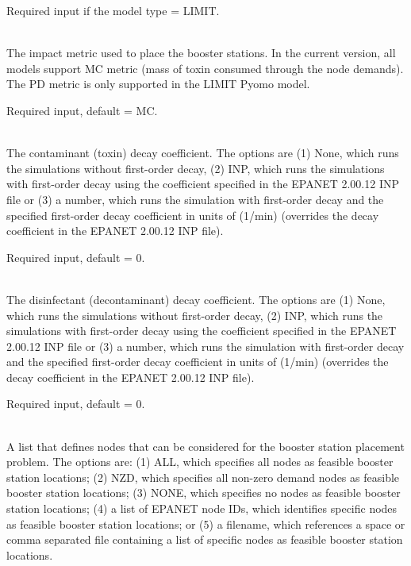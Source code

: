 \begin{description}[topsep=0pt,parsep=0.5em,itemsep=-0.4em]
\begin{description}[topsep=0pt,parsep=0.5em,itemsep=-0.4em]
                Required input if the model type = LIMIT.
    \item[{objective}]\hfill
\\The impact metric used to place the booster stations.
                In the current version, all models support MC metric
                (mass of toxin consumed through the node demands). The
                PD metric is only supported in the LIMIT Pyomo model.                
                
                Required input, default = MC.
    \item[{toxin decay coefficient}]\hfill
\\The contaminant (toxin) decay coefficient. The options are 
				(1) None, which runs the simulations without first-order decay, 
				(2) INP, which runs the simulations with first-order decay using the
                coefficient specified in the EPANET 2.00.12 INP file or (3) a number, which 
				runs the simulation with first-order decay and the specified first-order
				decay coefficient in units of (1/min) (overrides the decay coefficient 
				in the EPANET 2.00.12 INP file).
                
                Required input, default = 0.
    \item[{decon decay coefficient}]\hfill
\\The disinfectant (decontaminant) decay coefficient. The options are 
				(1) None, which runs the simulations without first-order decay, 
				(2) INP, which runs the simulations with first-order decay using the
                coefficient specified in the EPANET 2.00.12 INP file or (3) a number, which 
				runs the simulation with first-order decay and the specified first-order
				decay coefficient in units of (1/min) (overrides the decay coefficient 
				in the EPANET 2.00.12 INP file).
                
                Required input, default = 0.
    \item[{feasible nodes}]\hfill
\\A list that defines nodes that can be considered for the booster station placement problem.
                The options are: (1) ALL, which specifies all nodes as feasible booster station locations;
                (2) NZD, which specifies all non-zero demand nodes as feasible booster station locations;
                (3) NONE, which specifies no nodes as feasible booster station locations;
                (4) a list of EPANET node IDs, which identifies specific nodes as feasible booster station locations; or
                (5) a filename, which references a space or comma separated file containing a list of 
                specific nodes as feasible booster station locations. 
                

\end{description}
\end{description}
